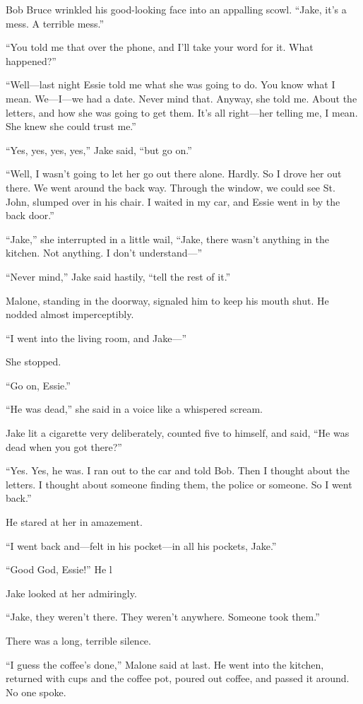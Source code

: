 \documentclass{novel}
\begin{document}
Bob Bruce wrinkled his good-looking face into an appalling scowl. “Jake, it’s a mess. A terrible mess.”

“You told me that over the phone, and I’ll take your word for it. What happened?”

“Well—last night Essie told me what she was going to do. You know what I mean. We—I—we had a date. Never mind that. Anyway, she told me. About the letters, and how she was going to get them. It’s all right—her telling me, I mean. She knew she could trust me.”

“Yes, yes, yes, yes,” Jake said, “but go on.”

“Well, I wasn’t going to let her go out there alone. Hardly. So I drove her out there. We went around the back way. Through the window, we could see St. John, slumped over in his chair. I waited in my car, and Essie went in by the back door.”

“Jake,” she interrupted in a little wail, “Jake, there wasn’t anything in the kitchen. Not anything. I don’t understand—”

“Never mind,” Jake said hastily, “tell the rest of it.”

Malone, standing in the doorway, signaled him to keep his mouth shut. He nodded almost imperceptibly.

“I went into the living room, and Jake—”

She stopped.

“Go on, Essie.”

“He was dead,” she said in a voice like a whispered scream.

Jake lit a cigarette very deliberately, counted five to himself, and said, “He was dead when you got there?”

“Yes. Yes, he was. I ran out to the car and told Bob. Then I thought about the letters. I thought about someone finding them, the police or someone. So I went back.”

He stared at her in amazement.

“I went back and—felt in his pocket—in all his pockets, Jake.”

“Good God, Essie!” He l

Jake looked at her admiringly.

“Jake, they weren’t there. They weren’t anywhere. Someone took them.”

There was a long, terrible silence.

“I guess the coffee’s done,” Malone said at last. He went into the kitchen, returned with cups and the coffee pot, poured out coffee, and passed it around. No one spoke.
\end{document}
